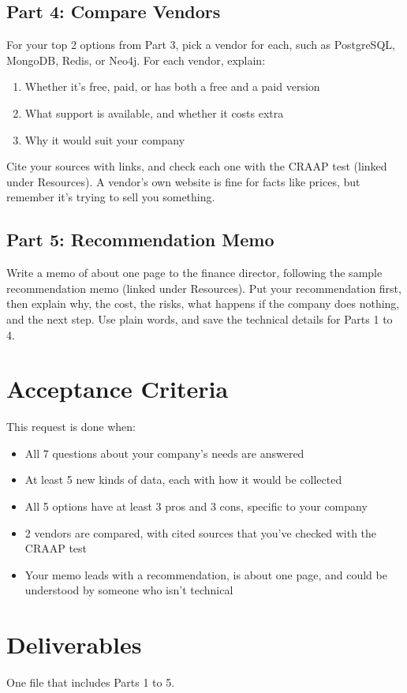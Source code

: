 \documentclass[12pt]{article}
\begin{document}
\subsection*{Part 4: Compare Vendors}
For your top 2 options from Part 3, pick a vendor for each, such as PostgreSQL, MongoDB, Redis, or Neo4j. For each vendor, explain:
\begin{enumerate}
    \item Whether it's free, paid, or has both a free and a paid version
    \item What support is available, and whether it costs extra
    \item Why it would suit your company
\end{enumerate}
Cite your sources with links, and check each one with the CRAAP test (linked under Resources). A vendor's own website is fine for facts like prices, but remember it's trying to sell you something.

\subsection*{Part 5: Recommendation Memo}
Write a memo of about one page to the finance director, following the sample recommendation memo (linked under Resources). Put your recommendation first, then explain why, the cost, the risks, what happens if the company does nothing, and the next step. Use plain words, and save the technical details for Parts 1 to 4.

\section*{Acceptance Criteria}
This request is done when:
\begin{itemize}
    \item All 7 questions about your company's needs are answered
    \item At least 5 new kinds of data, each with how it would be collected
    \item All 5 options have at least 3 pros and 3 cons, specific to your company
    \item 2 vendors are compared, with cited sources that you've checked with the CRAAP test
    \item Your memo leads with a recommendation, is about one page, and could be understood by someone who isn't technical
\end{itemize}

\section*{Deliverables}
One file that includes Parts 1 to 5.
\end{document}
